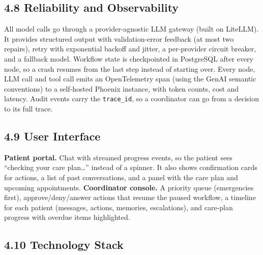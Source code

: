 \documentclass[11pt,a4paper]{article}
\begin{document}
\subsection*{4.8 Reliability and Observability}

All model calls go through a provider-agnostic LLM gateway (built on LiteLLM). It provides structured output with validation-error feedback (at most two repairs), retry with exponential backoff and jitter, a per-provider circuit breaker, and a fallback model. Workflow state is checkpointed in PostgreSQL after every node, so a crash resumes from the last step instead of starting over. Every node, LLM call and tool call emits an OpenTelemetry span (using the GenAI semantic conventions) to a self-hosted Phoenix instance, with token counts, cost and latency. Audit events carry the \texttt{trace\_id}, so a coordinator can go from a decision to its full trace.

\subsection*{4.9 User Interface}

\textbf{Patient portal.} Chat with streamed progress events, so the patient sees ``checking your care plan\ldots'' instead of a spinner. It also shows confirmation cards for actions, a list of past conversations, and a panel with the care plan and upcoming appointments.
\textbf{Coordinator console.} A priority queue (emergencies first), approve/deny/answer actions that resume the paused workflow, a timeline for each patient (messages, actions, memories, escalations), and care-plan progress with overdue items highlighted.

\subsection*{4.10 Technology Stack}
\end{document}
